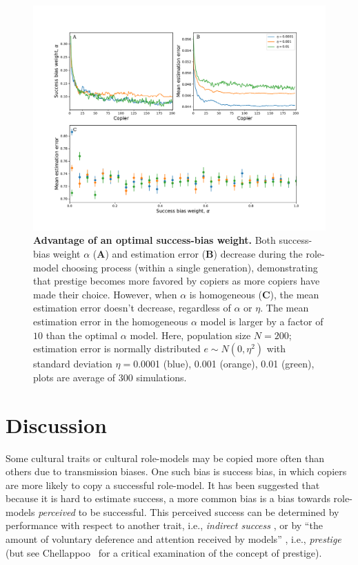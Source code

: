 \documentclass[12pt]{extarticle}
\begin{document}
\begin{figure}[h]
    \includegraphics[width=\linewidth]{choose_bias.pdf}
  \caption{
  \textbf{Advantage of an optimal success-bias weight.}
  Both success-bias weight $\alpha$ (\textbf{A}) and estimation error (\textbf{B}) decrease during the role-model choosing process (within a single generation), demonstrating that prestige becomes more favored by copiers as more copiers have made their choice.
However, when $\alpha$ is homogeneous (\textbf{C}), the mean estimation error doesn't decrease, regardless of $\alpha$ or $\eta$.
The mean estimation error in the homogeneous $\alpha$ model is larger by a factor of $10$ than the optimal $\alpha$ model.
Here, population size $N=200$; estimation error is normally distributed $e \sim N(0,\eta^2)$ with standard deviation $\eta=$0.0001 (blue), 0.001 (orange), 0.01 (green), plots are average of $300$ simulations.}	
  \label{fig:influence_advantage}
\end{figure}



\section*{Discussion}
Some cultural traits or cultural role-models may be copied more often than others due to transmission biases. 
One such bias is success bias, in which copiers are more likely to copy a successful role-model. 
It has been suggested that because it is hard to estimate success, a more common bias is a bias towards role-models \emph{perceived} to be successful.
This perceived success can be determined by performance with respect to another trait, i.e., \emph{indirect success} \citep{evolutionBook,fijian_social_bias}, or by ``the amount of voluntary deference and attention received by models'' \citep{prestigeSocialLearn}, i.e., \emph{prestige} \citep{prestige_cultural_learning,prestige_evolution} (but see Chellappoo~\citep{rethinkPrestige} for a critical examination of the concept of prestige).
\end{document}
